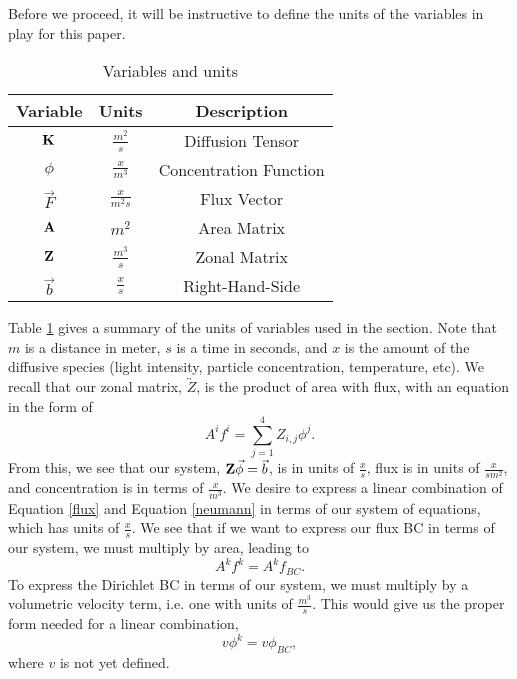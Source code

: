 \documentclass[11pt,letterpaper,oneside,notitlepage]{article}	%
\newcommand{\tensor}{\overleftrightarrow}		%
\newcommand{\eq}[1]{Equation \eqref{#1}}		%
\begin{document}
Before we proceed, it will be instructive to define the units of the variables in play for this paper.
\begin{table}[h]	%
\begin{centering}	%
\begin{tabular}{| c | c | c |}	%
\hline	%
Variable & Units & Description \\
  \hline\hline
  $\bf K$ & $\frac{m^2}{s}$ & Diffusion Tensor \\	\hline 
  $\phi$ & $\frac{x}{m^3}$ & Concentration Function \\	\hline
  $\vec F$ & $\frac{x}{m^2 s}$ & Flux Vector \\	\hline
  $\bf A$  & $m^2$ & Area Matrix \\	\hline
  $\bf Z$  & $\frac{m^3}{s}$ & Zonal Matrix \\	\hline
  $\vec b$  &  $\frac{x}{s}$ & Right-Hand-Side \\
  \hline  
\end{tabular}
\caption{Variables and units}	%
\end{centering}
\label{Units}
\end{table}
Table \ref{Units} gives a summary of the units of variables used in the section. Note that $m$ is a distance in meter, $s$ is a time in seconds, and $x$ is the amount of the diffusive species (light intensity, particle concentration, temperature, etc). We recall that our zonal matrix, $\tensor Z$, is the product of area with flux, with an equation in the form of 
\begin{equation}
A^i f^i = \sum_{j=1}^4 Z_{i,j} \phi^j \label{FluxSystem}
.\end{equation}
From this, we see that our system, ${\bf Z}\vec\phi=\vec b$, is in units of $\frac{x}{s}$, flux is in units of $\frac{x}{sm^2}$, and concentration is in terms of $\frac{x}{m^3}$. We desire to express a linear combination of \eq{flux} and \eq{neumann} in terms of our system of equations, which has units of $\frac{x}{s}$. We see that if we want to express our flux BC in terms of our system, we must multiply by area, leading to 
\begin{equation}
A^k f^k = A^k f_{BC} \label{N}
.\end{equation}
To express the Dirichlet BC in terms of our system, we must multiply by a volumetric velocity term, i.e. one with units of $\frac{m^3}{s}$. This would give us the proper form needed for a linear combination,
\begin{equation}
v\phi^k = v\phi_{BC} \label{D},
\end{equation}
where $v$ is not yet defined.
\end{document}
